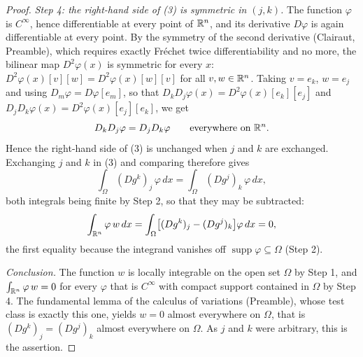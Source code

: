 \begin{proof}
\emph{Step 4: the right-hand side of (3) is symmetric in $(j,k)$.}  The function
$\varphi$ is $C^\infty$, hence differentiable at every point of $\mathbb{R}^n$, and its
derivative $D\varphi$ is again differentiable at every point.  By the symmetry
of the second derivative (Clairaut, Preamble), which requires exactly Fr\'echet
twice differentiability and no more, the bilinear map $D^2\varphi(x)$ is
symmetric for every $x$:
$D^2\varphi(x)[v][w]=D^2\varphi(x)[w][v]$ for all $v,w\in\mathbb{R}^n$.  Taking
$v=e_k$, $w=e_j$ and using $D_m\varphi=D\varphi[e_m]$, so that
$D_kD_j\varphi(x)=D^2\varphi(x)[e_k][e_j]$ and
$D_jD_k\varphi(x)=D^2\varphi(x)[e_j][e_k]$, we get
\[
D_kD_j\varphi=D_jD_k\varphi\qquad\text{everywhere on }\mathbb{R}^n .
\]
Hence the right-hand side of (3) is unchanged when $j$ and $k$ are exchanged.
Exchanging $j$ and $k$ in (3) and comparing therefore gives
\[
\int_\Omega (Dg^k)_j\,\varphi\,dx=\int_\Omega (Dg^j)_k\,\varphi\,dx ,
\]
both integrals being finite by Step 2, so that they may be subtracted:
\[
\int_{\mathbb{R}^n}\varphi\,w\,dx=\int_\Omega\bigl[(Dg^k)_j-(Dg^j)_k\bigr]\varphi\,dx=0 ,
\]
the first equality because the integrand vanishes off
$\operatorname{supp}\varphi\subseteq\Omega$ (Step 2).

\emph{Conclusion.}  The function $w$ is locally integrable on the open set
$\Omega$ by Step 1, and $\int_{\mathbb{R}^n}\varphi\,w=0$ for every $\varphi$ that is
$C^\infty$ with compact support contained in $\Omega$ by Step 4.  The
fundamental lemma of the calculus of variations (Preamble), whose test class is
exactly this one, yields $w=0$ almost everywhere on $\Omega$, that is
$(Dg^k)_j=(Dg^j)_k$ almost everywhere on $\Omega$.  As $j$ and $k$ were
arbitrary, this is the assertion.
\end{proof}

